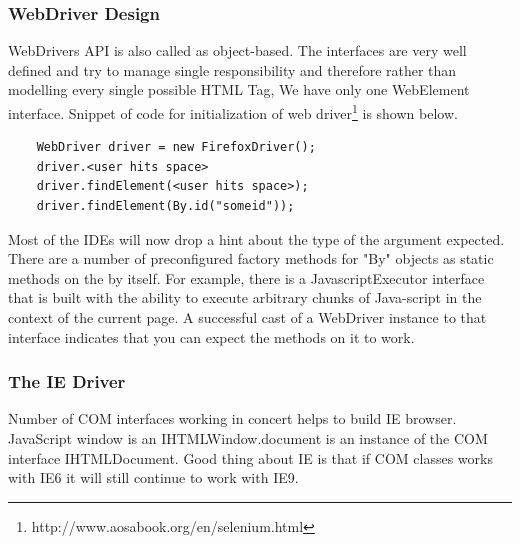 \documentclass[article,type=msc,colorback,accentcolor=tud9c,twoside,11pt]{tudthesis}
\begin{document}
	\subsubsection{WebDriver Design}
	WebDrivers API \cite{SeleniumTestingFramework} is also called as  object-based. The interfaces are very well defined and try to manage single responsibility and therefore rather than modelling every single possible HTML Tag, We have only one WebElement interface. Snippet of code for initialization of web driver\footnote{http://www.aosabook.org/en/selenium.html} is shown below.
	\begin{lstlisting}
	WebDriver driver = new FirefoxDriver();
	driver.<user hits space>
	driver.findElement(<user hits space>);
	driver.findElement(By.id("someid"));
	\end{lstlisting}
	Most of the IDEs will now drop a hint about the type of the argument expected. There are a number of preconfigured factory methods for "By" objects as static methods on the by itself. For example, there is a JavascriptExecutor interface that is built with the ability to execute arbitrary chunks of Java-script in the context of the current page. A successful cast of a WebDriver instance to that interface indicates that you can expect the methods on it to work.
	\subsubsection{The IE Driver}
	Number of COM interfaces working in concert helps to build IE browser. JavaScript window is an IHTMLWindow.document is an instance of the COM interface IHTMLDocument. Good thing about IE is that if COM classes works with IE6 it will still continue to work with IE9.
	
\end{document}
